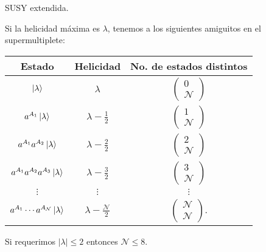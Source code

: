 \documentclass[10pt,a4paper]{beamer}
\begin{document}
\begin{frame}{SUSY extendida.}

Si la helicidad máxima es $\lambda$, tenemos a los siguientes amiguitos en el
supermultiplete:
\begin{center}
  \begin{tabular}{c|c|c}
    Estado & Helicidad & No. de estados distintos \\
    \hline
  $\ket{\lambda}$ & $\lambda$ & $\begin{pmatrix} 0\\ \mathcal{N}\end{pmatrix}$\\
  $a^{A_1} \ket{\lambda}$ & $\lambda -\frac{1}{2}$ & $\begin{pmatrix} 1\\ \mathcal{N}\end{pmatrix}$\\
  $a^{A_1}a^{A_2} \ket {\lambda}$ & $\lambda-\frac{2}{2}$ & $\begin{pmatrix} 2\\ \mathcal{N}\end{pmatrix}$\\
  $a^{A_1}a^{A_2} a^{A_3}\ket {\lambda}$ & $\lambda-\frac{3}{2}$ & $\begin{pmatrix} 3\\ \mathcal{N}\end{pmatrix}$\\
    $\vdots $&$\vdots$&$\vdots$\\
  $a^{A_1}\cdots a^{A_\mathcal{N}}\ket {\lambda}$ &
  $\lambda-\frac{\mathcal{N}}{2}$ & $\begin{pmatrix} \mathcal{N}\\
  \mathcal{N}\end{pmatrix}$.\\
\end{tabular}
\end{center}
Si requerimos $|\lambda|\leq 2$ entonces
$\mathcal{N}\leq 8$.

\end{frame}
\end{document}
